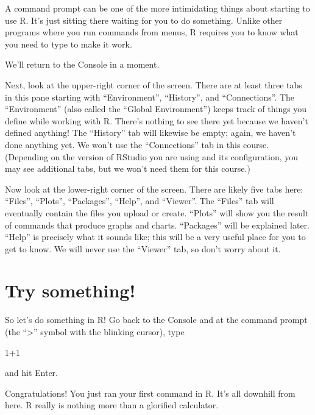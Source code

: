\documentclass[
]{book}
\newenvironment{Shaded}{\begin{snugshade}}{\end{snugshade}}
\newcommand{\DecValTok}[1]{\textcolor[rgb]{0.00,0.00,0.81}{#1}}
\newcommand{\SpecialCharTok}[1]{\textcolor[rgb]{0.00,0.00,0.00}{#1}}
\begin{document}
A command prompt can be one of the more intimidating things about starting to use R. It's just sitting there waiting for you to do something. Unlike other programs where you run commands from menus, R requires you to know what you need to type to make it work.

We'll return to the Console in a moment.

Next, look at the upper-right corner of the screen. There are at least three tabs in this pane starting with ``Environment'', ``History'', and ``Connections''. The ``Environment'' (also called the ``Global Environment'') keeps track of things you define while working with R. There's nothing to see there yet because we haven't defined anything! The ``History'' tab will likewise be empty; again, we haven't done anything yet. We won't use the ``Connections'' tab in this course. (Depending on the version of RStudio you are using and its configuration, you may see additional tabs, but we won't need them for this course.)

Now look at the lower-right corner of the screen. There are likely five tabs here: ``Files'', ``Plots'', ``Packages'', ``Help'', and ``Viewer''. The ``Files'' tab will eventually contain the files you upload or create. ``Plots'' will show you the result of commands that produce graphs and charts. ``Packages'' will be explained later. ``Help'' is precisely what it sounds like; this will be a very useful place for you to get to know. We will never use the ``Viewer'' tab, so don't worry about it.

\hypertarget{intror-trysomething}{%
\section{Try something!}\label{intror-trysomething}}

So let's do something in R! Go back to the Console and at the command prompt (the ``\textgreater{}'' symbol with the blinking cursor), type

\begin{Shaded}
\begin{Highlighting}[]
\DecValTok{1}\SpecialCharTok{+}\DecValTok{1}
\end{Highlighting}
\end{Shaded}

and hit Enter.

Congratulations! You just ran your first command in R. It's all downhill from here. R really is nothing more than a glorified calculator.
\end{document}
